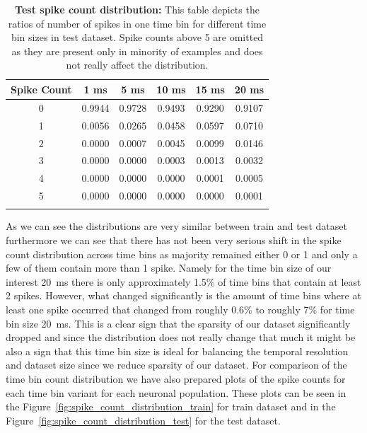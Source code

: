 \begin{table}
    \centering\footnotesize\sf
    \begin{tabular}{cccccc}
    \toprule
        Spike Count & 1 ms & 5 ms & 10 ms & 15 ms & 20 ms \\
    \midrule
        0 & 0.9944 & 0.9728 & 0.9493 & 0.9290 & 0.9107 \\
        1 & 0.0056 & 0.0265 & 0.0458 & 0.0597 & 0.0710 \\
        2 & 0.0000 & 0.0007 & 0.0045 & 0.0099 & 0.0146 \\
        3 & 0.0000 & 0.0000 & 0.0003 & 0.0013 & 0.0032 \\
        4 & 0.0000 & 0.0000 & 0.0000 & 0.0001 & 0.0005 \\
        5 & 0.0000 & 0.0000 & 0.0000 & 0.0000 & 0.0001 \\
    \addlinespace %
    \bottomrule
    \end{tabular}
    \caption{\textbf{Test spike count distribution:} This table depicts the ratios of number of spikes in one time bin for different time bin sizes in test dataset. Spike counts above 5 are omitted as they are present only in minority of examples and does not really affect the distribution.}
    \label{tab:test_bin_count_distribution}
\end{table}

As we can see the distributions are very similar between train and test dataset furthermore we can see that there has not been very serious shift in the spike count distribution across time bins as majority remained either 0 or 1 and only a few of them contain more than 1 spike. Namely for the time bin size of our interest 20~ms there is only approximately 1.5\% of time bins that contain at least 2 spikes. However, what changed significantly is the amount of time bins where at least one spike occurred that changed from roughly 0.6\% to roughly 7\% for time bin size 20~ms. This is a clear sign that the sparsity of our dataset significantly dropped and since the distribution does not really change that much it might be also a sign that this time bin size is ideal for balancing the temporal resolution and dataset size since we reduce sparsity of our dataset. For comparison of the time bin count distribution we have also prepared plots of the spike counts for each time bin variant for each neuronal population. These plots can be seen in the Figure~\ref{fig:spike_count_distribution_train} for train dataset and in the Figure~\ref{fig:spike_count_distribution_test} for the test dataset.

